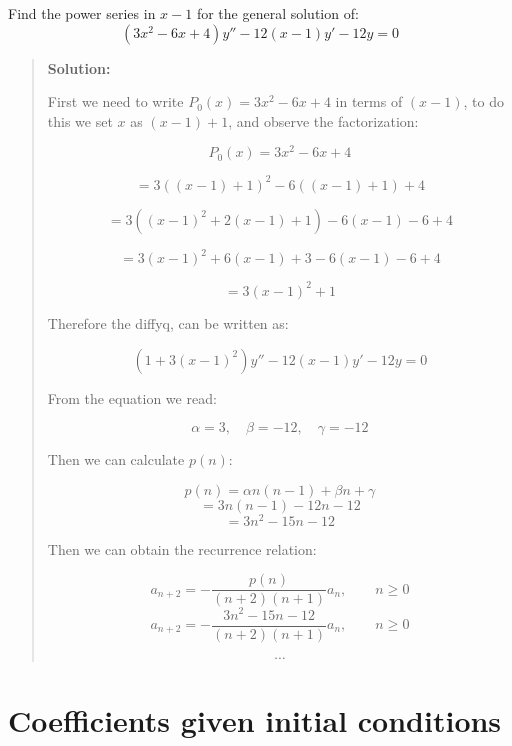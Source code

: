 \documentclass[
  letterpaper,
  DIV=11,
  numbers=noendperiod]{scrreprt}
\theoremstyle{plain}
\theoremstyle{remark}
\begin{document}
\begin{tcolorbox}[enhanced jigsaw, title=\textcolor{quarto-callout-tip-color}{\faLightbulb}\hspace{0.5em}{Example}, colbacktitle=quarto-callout-tip-color!10!white, opacitybacktitle=0.6, opacityback=0, rightrule=.15mm, breakable, titlerule=0mm, colback=white, bottomtitle=1mm, colframe=quarto-callout-tip-color-frame, toprule=.15mm, leftrule=.75mm, toptitle=1mm, arc=.35mm, bottomrule=.15mm, left=2mm, coltitle=black]

Find the power series in \(x-1\) for the general solution of:
\[(3x^2-6x+4)y''-12(x-1)y'-12y=0\]

\begin{quote}
\textbf{Solution:}

First we need to write \(P_0(x)=3x^2-6x+4\) in terms of \((x-1)\), to do
this we set \(x\) as \((x-1)+1\), and observe the
factorization\footnotemark{}:

\[P_0(x)=3x^2-6x+4\]

\[=3((x-1)+1)^2-6((x-1)+1)+4\]

\[=3((x-1)^2+2(x-1)+1)-6(x-1)-6+4\]

\[=3(x-1)^2+6(x-1)+3-6(x-1)-6+4\]

\[=3(x-1)^2+1\]

Therefore the diffyq, can be written as:

\[(1+3(x-1)^2)y''-12(x-1)y'-12y=0\]

From the equation we read:

\[\alpha = 3,\quad \beta= -12,\quad \gamma=-12\]

Then we can calculate \(p(n)\):

\[p(n)=\alpha n(n-1)+\beta n +\gamma\] \[=3n(n-1)-12n -12\]
\[=3n^2-15n-12\]

Then we can obtain the recurrence relation:

\[a_{n+2}=-\frac{p(n)}{(n+2)(n+1)}a_n,\qquad n\geq 0\]
\[\boxed{a_{n+2}=-\frac{3n^2-15n-12}{(n+2)(n+1)}a_n},\qquad n\geq 0\]

\[\cdots\]
\end{quote}

\end{tcolorbox}


\section{Coefficients given initial
conditions}\label{coefficients-given-initial-conditions}
\end{document}
